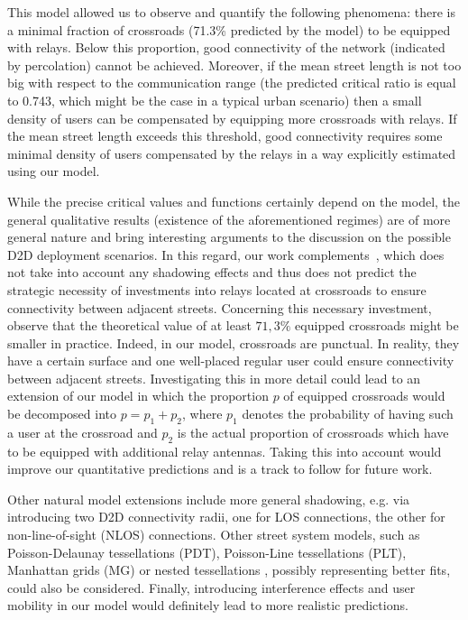 \documentclass[conference]{IEEEtran}
\begin{document}
This model allowed us to observe and quantify the following phenomena:
there is a minimal fraction of crossroads (71.3\% predicted by the model) to be equipped with relays. Below this proportion, good connectivity of the network (indicated by percolation) cannot be achieved. Moreover, if the mean street length is not too big  with  
respect to the communication range (the predicted critical ratio is equal to 0.743, which  might be the case in a typical urban scenario) then a small density  of  users  can  be  compensated by equipping more  crossroads with relays. 
If the mean street length exceeds this threshold,
good connectivity requires some minimal density of users compensated by the relays
in a way  explicitly estimated using our model.


While the precise critical values and functions 
certainly depend on the model, the general qualitative results 
(existence of the aforementioned regimes) are of more general nature and bring interesting  arguments to the discussion on the  possible D2D deployment scenarios.
In this regard, our work complements~\cite{cali2018percolation}, which 
does  not take into account any shadowing effects and thus does not predict
the strategic necessity of investments into relays located at crossroads to ensure connectivity between adjacent streets.
Concerning this necessary investment, observe that
the theoretical value of at least $71,3\%$ equipped crossroads might be 
smaller in practice. Indeed, in our model, crossroads are punctual. In reality, they have a certain surface and one well-placed regular user could ensure connectivity between adjacent streets.
Investigating this in more detail could lead to an extension of our model in which the proportion $p$ of equipped crossroads would be decomposed into $p=p_1+p_2$, where $p_1$ denotes the probability of having such a user at the crossroad and $p_2$ is the actual proportion of crossroads which have to be equipped with additional relay antennas. 
Taking this into account would improve our quantitative predictions and is a track to follow for future work.

Other natural model extensions include more general shadowing,
e.g. via introducing two D2D connectivity radii, one for LOS connections, the other for non-line-of-sight (NLOS) connections. Other street system models, such as Poisson-Delaunay tessellations (PDT), Poisson-Line tessellations (PLT), Manhattan grids (MG) or nested tessellations \cite{gloaguen2006fitting}, possibly representing better fits, could also be considered.
Finally, introducing interference effects and user mobility in our model would definitely lead to more realistic predictions.  




\end{document}
